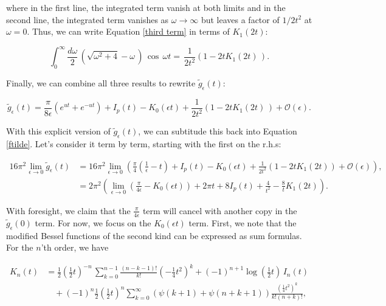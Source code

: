 \documentclass{article}
\numberwithin{equation}{section} %
\begin{document}
\noindent where in the first line, the integrated term vanish at both limits and in the second line, the integrated term vanishes as $\omega\rightarrow \infty$ but leaves a factor of $1/2t^2$ at $\omega=0$. Thus, we can write Equation \ref{third term} in terms of $K_1(2t)$:

\begin{equation}
\int^\infty_0 \frac{d\omega}{2}\, \left(\sqrt{\omega^2 + 4} - \omega\,\right)\, \cos \, \omega t  = \,\frac{1}{2t^2}( 1 - 2tK_1(2t)\,).
\end{equation}

Finally, we can combine all three results to rewrite $\tilde{g}_\epsilon(t)$:

\begin{equation}
\tilde{g}_\epsilon(t) = \frac{\pi}{8\epsilon}(e^{ut}+e^{-ut}) + I_p(t) -  K_0(\epsilon t) + \frac{1}{2t^2}( 1 - 2tK_1(2t)\,) + \mathcal{O}(\epsilon).
\end{equation}

With this explicit version of $\tilde{g}_\epsilon(t)$, we can subtitude this back into Equation \ref{ftilde}. Let's consider it term by term, starting with the first on the r.h.s:

\begin{equation}
\begin{split}
16\pi^2\lim_{\epsilon \rightarrow 0} \tilde{g}_\epsilon(t) &= 16\pi^2 \lim_{\epsilon\rightarrow 0} \left( \frac{\pi}{4}(\frac{1}{\epsilon}-t) + I_p(t) - K_0(\epsilon t) + \frac{1}{2t^2}(1-2tK_1(2t)) + \mathcal{O}(\epsilon) \right),\\
&= 2\pi^2 \left( \lim_{\epsilon\rightarrow 0} \left( \frac{\pi}{4\epsilon} - K_0(\epsilon t)\right) + 2\pi t + 8I_p(t)  + \frac{4}{t^2} - \frac{8}{t}K_1(2t) \right).
\end{split}
\label{lim 1}
\end{equation}

\noindent With foresight, we claim that the $\frac{\pi}{4\epsilon}$ term will cancel with another copy in the $\tilde{g}_\epsilon(0)$ term. For now, we focus on the $K_0(\epsilon t)$ term. First, we note that the modified Bessel functions of the second kind can be expressed as sum formulas\cite{bessel}. For the $n$'th order, we have

\begin{equation}
\begin{split}
K_n(t) &= \frac{1}{2}\left(\frac{1}{2}t\right)^{-n} \, \sum^{n-1}_{k=0}\frac{(n-k-1)!}{k!}(-\frac{1}{4}t^2)^k + (-1)^{n+1} \log(\frac{1}{2}t)\, I_n(t) \\
& \quad + (-1)^n\frac{1}{2}\left(\frac{1}{2}t\right)^n\sum^\infty_{k=0}\left( \psi(k+1) + \psi(n+k+1) \right)\frac{(\frac{1}{4}t^2)^k}{k!(n+k)!},
\end{split}
\end{equation}
\end{document}
